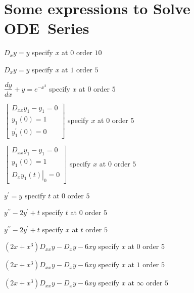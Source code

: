 \documentclass{article}
\begin{document}
\section{Some expressions to Solve ODE\ Series}

$D_{x}y=y$ specify $x$ at $0$ order $10$

$D_{x}y=y$ specify $x$ at $1$ order $5$

$\dfrac{dy}{dx}+y=e^{-x^{2}}$ specify $x$ at $0$ order $5$

$\left[ 
\begin{array}{r}
D_{xx}y_{1}-y_{1}=0 \\ 
y_{1}(0)=1 \\ 
y_{1}^{\prime }\left( 0\right) =0%
\end{array}%
\right] $ specify $x$ at $0$ order $5$

$\left[ 
\begin{array}{r}
D_{xx}y_{1}-y_{1}=0 \\ 
y_{1}(0)=1 \\ 
\left. D_{x}y_{1}\left( t\right) \right\vert _{0}=0%
\end{array}%
\right] $ specify $x$ at $0$ order $5$

$y^{\prime }=y$ specify $t$ at $0$ order $5$

$y^{\prime \prime }-2y^{\prime }+t\allowbreak $ specify $t$ at $0$ order $5$

$y^{\prime \prime }-2y^{\prime }+t\allowbreak $ specify $x$ at $t$ order $5$

$\left( 2x+x^{3}\right) D_{xx}y-D_{x}y-6xy$ specify $x$ at $0$ order $5$

$\left( 2x+x^{3}\right) D_{xx}y-D_{x}y-6xy$ specify $x$ at $1$ order $5$

$\left( 2x+x^{3}\right) D_{xx}y-D_{x}y-6xy$ specify $x$ at $\infty $ order $%
5 $
\end{document}
